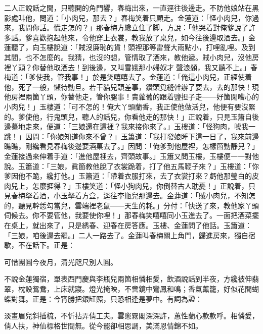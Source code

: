 二人正說話之間，只聽開的角門響，春梅出來，一直逕往後邊走。不防他娘站在黑影處叫他，問道：「小肉兒，那去？」春梅笑着只顧走。{}金蓮道：「怪小肉兒，你過來，我問你話。慌走怎的？」那春梅方纔立住了脚，方說：「他哭着對俺爹說了許多話。爹喜歡抱起他來，令他穿上衣裳，教我放了桌兒，如今往後邊取酒去。」金蓮聽了，向玉樓說道：「賊沒廉恥的貨！頭裡那等雷聲大雨點小，打哩亂哩。及到其間，也不怎麼的。我猜，也沒的想，管情取了酒來，教他遞。{}賊小肉兒，沒他房裡丫頭？你替他取酒去！到後邊，又叫雪娥那小婦奴才𣭈聲浪顙，{}我又聽不上。」春梅道：「爹使我，管我事！」於是笑嘻嘻去了。金蓮道：「俺這小肉兒，正經使着他，死了一般，懶待動旦。{}若干貓兒頭差事，鑽頭覓縫幹辦了要去，去的那快！現他房裡兩箇丫頭，你替他走，管你腿事！賣蘿葡的跟着鹽担子走——好箇閑嘈心的小肉兒！」玉樓道：「可不怎的！俺大丫頭蘭香，我正使他做活兒，他便有要沒緊的。爹使他，行鬼頭兒，聽人的話兒，你看他走的那快！」正說着，只見玉簫自後邊驀地走來，便道：「三娘還在這裡？我來接你來了。」玉樓道：「怪狗肉，唬我一跳！」{}因問：「你娘知道你來不曾？」玉簫道：「我打發娘睡下這一日了，我來前邊瞧瞧，剛纔看見春梅後邊要酒菓去了。」因問：「俺爹到他屋裡，怎樣箇動靜兒？」金蓮接過來伸着手道：「進他屋裡去，齊頭故事。」{}玉簫又問玉樓，玉樓便一一對他說。玉簫道：「三娘，眞箇教他脫了衣裳跪着，打了他五馬鞭子來？」玉樓道：「你爹因他不跪，纔打他。」玉簫道：「帶着衣服打來，去了衣裳打來？虧他那瑩白的皮肉兒上，怎麼捱得？」{}玉樓笑道：「怪小狗肉兒，你倒替古人耽憂！」正說着，只見春梅拏着酒，小玉拏着方盒，逕往李瓶兒那邊去。金蓮道：「賊小肉兒，不知怎的，聽見幹恁勾當兒，雲端裡老鼠——天生的耗。」分付：「快送了來，教他家丫頭伺候去。你不要管他，我要使你哩！」那春梅笑嘻嘻同小玉進去了。一面把酒菜擺在桌上，就出來了，只是綉春、迎春在房答應。玉樓、金蓮問了他話。玉簫道：「三娘，咱後邊去罷。」二人一路去了。金蓮叫春梅關上角門，歸進房來，獨自宿歇，不在話下。正是：

\begin{myquote} 
可惜團圓今夜月，清光咫尺別人圓。
\end{myquote} 

不說金蓮獨宿，單表西門慶與李瓶兒兩箇相憐相愛，飲酒說話到半夜，方纔被伸翡翠，枕設鴛鴦，上床就寢。燈光掩映，不啻鏡中鸞鳳和鳴；香氣薰籠，好似花間蝴蝶對舞。正是：今宵勝把銀缸照，只恐相逢是夢中。有詞為證：

\begin{myquote} 
淡畫眉兒斜插梳，不忻拈弄倩工夫。雲窻霧閣深深許，蕙性蘭心款款呼。相憐愛，倩人扶，神仙標格世間無。從今罷卻相思調，美滿恩情錦不如。
\end{myquote} 

